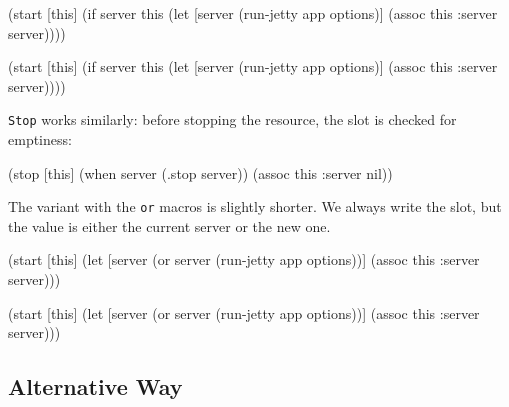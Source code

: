 \ifnarrow

\begin{english}
  \begin{clojure}
(start [this]
  (if server
    this
    (let [server (run-jetty
                   app options)]
      (assoc this :server server))))
  \end{clojure}
\end{english}

\else

\begin{english}
  \begin{clojure}
(start [this]
  (if server
    this
    (let [server (run-jetty app options)]
      (assoc this :server server))))
  \end{clojure}
\end{english}

\fi

\noindent
\verb|Stop| works similarly: before stopping the resource, the slot is checked for emptiness:

\begin{english}
  \begin{clojure}
(stop [this]
  (when server
    (.stop server))
  (assoc this :server nil))
  \end{clojure}
\end{english}

The variant with the \verb|or| macros is slightly shorter. We always write the slot, but the value is either the current server or the new one.

\ifnarrow

\begin{english}
  \begin{clojure}
(start [this]
  (let [server (or server
                   (run-jetty
                     app options))]
    (assoc this :server server)))
  \end{clojure}
\end{english}

\else

\begin{english}
  \begin{clojure}
(start [this]
  (let [server (or server
                   (run-jetty app options))]
    (assoc this :server server)))
  \end{clojure}
\end{english}

\fi

\subsection{Alternative Way}

